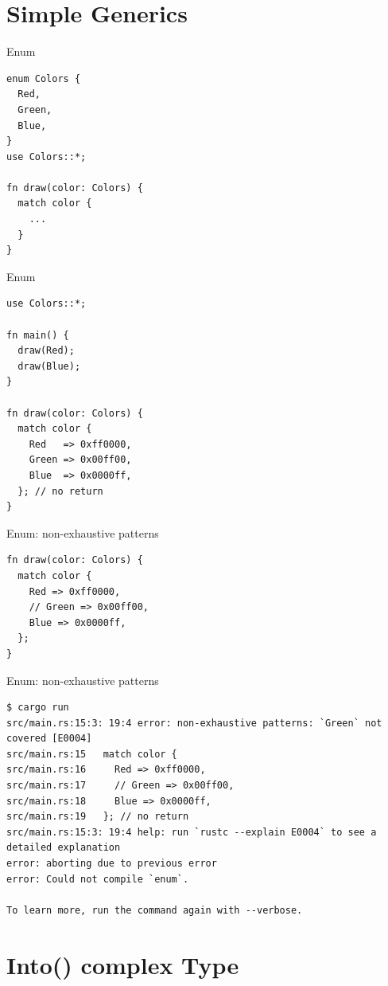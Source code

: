 \documentclass[aspectratio=1610,t]{beamer}
\begin{document}
{
\section{Simple Generics}
}
\begin{frame}[fragile]{Enum}
\begin{verbatim}
enum Colors {
  Red,
  Green,
  Blue,
}
use Colors::*;

fn draw(color: Colors) {
  match color {
    ...
  }
}
\end{verbatim}
\end{frame}

\begin{frame}[fragile]{Enum}
\begin{verbatim}
use Colors::*;

fn main() {
  draw(Red);
  draw(Blue);
}

fn draw(color: Colors) {
  match color {
    Red   => 0xff0000,
    Green => 0x00ff00,
    Blue  => 0x0000ff,
  }; // no return
}
\end{verbatim}
\end{frame}


\begin{frame}[fragile]{Enum: non-exhaustive patterns}
\begin{verbatim}
fn draw(color: Colors) {
  match color {
    Red => 0xff0000,
    // Green => 0x00ff00,
    Blue => 0x0000ff,
  };
}
\end{verbatim}
\end{frame}

\begin{frame}[fragile]{Enum: non-exhaustive patterns}
\begin{verbatim}
$ cargo run
src/main.rs:15:3: 19:4 error: non-exhaustive patterns: `Green` not covered [E0004]
src/main.rs:15   match color {
src/main.rs:16     Red => 0xff0000,
src/main.rs:17     // Green => 0x00ff00,
src/main.rs:18     Blue => 0x0000ff,
src/main.rs:19   }; // no return
src/main.rs:15:3: 19:4 help: run `rustc --explain E0004` to see a detailed explanation
error: aborting due to previous error
error: Could not compile `enum`.

To learn more, run the command again with --verbose.
\end{verbatim}
\end{frame}

{
\section{Into() complex Type}
}
\end{document}
